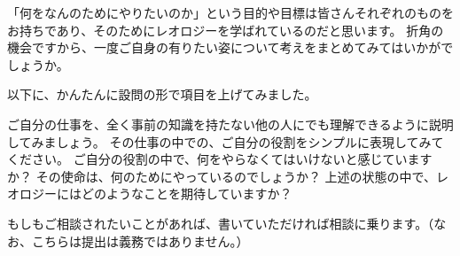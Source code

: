 \documentclass[uplatex,dvipdfmx,a4paper,11pt]{jsarticle}
\begin{document}
\begin{qparts}
    \qpart 「何をなんのためにやりたいのか」という目的や目標は皆さんそれぞれのものをお持ちであり、そのためにレオロジーを学ばれているのだと思います。
    折角の機会ですから、一度ご自身の有りたい姿について考えをまとめてみてはいかがでしょうか。

    以下に、かんたんに設問の形で項目を上げてみました。
    \vspace{-2mm}
    \begin{qlist}
        \qitem ご自分の仕事を、全く事前の知識を持たない他の人にでも理解できるように説明してみましょう。
        \qitem その仕事の中での、ご自分の役割をシンプルに表現してみてください。
        \qitem ご自分の役割の中で、何をやらなくてはいけないと感じていますか？
        \qitem その使命は、何のためにやっているのでしょうか？
        \qitem 上述の状態の中で、レオロジーにはどのようなことを期待していますか？
    \end{qlist}
    \vspace{-2mm}
    \qpart もしもご相談されたいことがあれば、書いていただければ相談に乗ります。（なお、こちらは提出は義務ではありません。）
\end{qparts}
\end{document}

